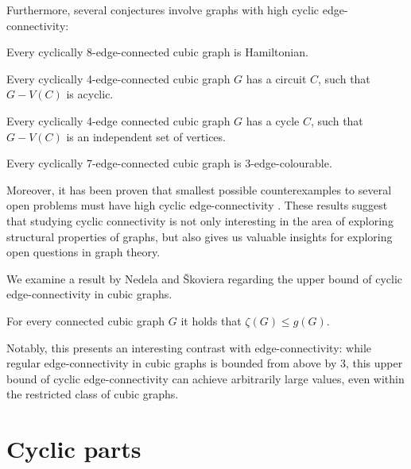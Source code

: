 \documentclass[12pt, twoside]{book}
\begin{document}
Furthermore, several conjectures involve graphs with high cyclic edge-connectivity:

\begin{conjecture}
	Every cyclically $8$-edge-connected cubic graph is Hamiltonian.
\end{conjecture}

\begin{conjecture}
	Every cyclically 4-edge-connected cubic graph $G$ has a circuit $C$, such that $G-V (C)$ is acyclic.
\end{conjecture}

\begin{conjecture}
	Every cyclically 4-edge connected cubic graph $G$ has a cycle $C$, such that $G-V(C)$ is an independent set of vertices.
\end{conjecture}

\begin{conjecture}
	Every cyclically 7-edge-connected cubic graph is 3-edge-colourable.
\end{conjecture}

Moreover, it has been proven that smallest possible counterexamples to several open problems must have high cyclic edge-connectivity \cite{Kochol2004, Macajova2020}. These results suggest that studying cyclic connectivity is not only interesting in the area of exploring structural properties of graphs, but also gives us valuable insights for exploring open questions in graph theory.

We examine a result by Nedela and Škoviera regarding the upper bound of cyclic edge-connectivity in cubic graphs. 

\begin{proposition}\label{prop:cyclic-con-less-than-girth}
	For every connected cubic graph $G$ it holds that $\zeta(G)\leq g(G)$.
\end{proposition}

Notably, this presents an interesting contrast with edge-connectivity: while regular edge-connectivity in cubic graphs is bounded from above by 3, this upper bound of cyclic edge-connectivity can achieve arbitrarily large values, even within the restricted class of cubic graphs.

\section{Cyclic parts}\label{sec:cyclic-parts}
\end{document}
